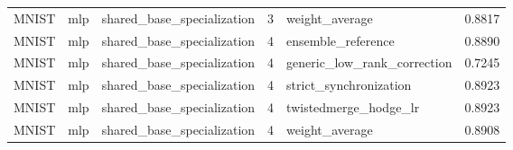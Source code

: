 \begin{table}[t]
\begin{tabular}{llllll}
MNIST & mlp & shared\_base\_specialization & 3 & weight\_average & 0.8817 \\
MNIST & mlp & shared\_base\_specialization & 4 & ensemble\_reference & 0.8890 \\
MNIST & mlp & shared\_base\_specialization & 4 & generic\_low\_rank\_correction & 0.7245 \\
MNIST & mlp & shared\_base\_specialization & 4 & strict\_synchronization & 0.8923 \\
MNIST & mlp & shared\_base\_specialization & 4 & twistedmerge\_hodge\_lr & 0.8923 \\
MNIST & mlp & shared\_base\_specialization & 4 & weight\_average & 0.8908 \\
\bottomrule
\end{tabular}
\end{table}
